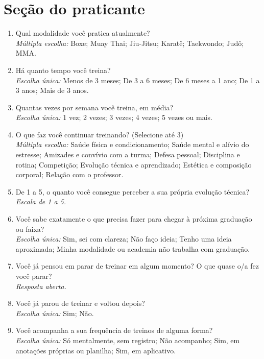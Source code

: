 \section*{Seção do praticante}
\begin{enumerate}[leftmargin=*, itemsep=1pt, parsep=0pt]
  \item Qual modalidade você pratica atualmente?\\
        {\footnotesize\textit{Múltipla escolha:} Boxe; Muay Thai; Jiu-Jitsu; Karatê; Taekwondo; Judô; MMA.}
  \item Há quanto tempo você treina?\\
        {\footnotesize\textit{Escolha única:} Menos de 3 meses; De 3 a 6 meses; De 6 meses a 1 ano; De 1 a 3 anos; Mais de 3 anos.}
  \item Quantas vezes por semana você treina, em média?\\
        {\footnotesize\textit{Escolha única:} 1 vez; 2 vezes; 3 vezes; 4 vezes; 5 vezes ou mais.}
  \item O que faz você continuar treinando? (Selecione até 3)\\
        {\footnotesize\textit{Múltipla escolha:} Saúde física e condicionamento; Saúde mental e alívio do estresse; Amizades e convívio com a turma; Defesa pessoal; Disciplina e rotina; Competição; Evolução técnica e aprendizado; Estética e composição corporal; Relação com o professor.}
  \item De 1 a 5, o quanto você consegue perceber a sua própria evolução técnica?\\
        {\footnotesize\textit{Escala de 1 a 5.}}
  \item Você sabe exatamente o que precisa fazer para chegar à próxima graduação ou faixa?\\
        {\footnotesize\textit{Escolha única:} Sim, sei com clareza; Não faço ideia; Tenho uma ideia aproximada; Minha modalidade ou academia não trabalha com graduação.}
  \item Você já pensou em parar de treinar em algum momento? O que quase o/a fez você parar?\\
        {\footnotesize\textit{Resposta aberta.}}
  \item Você já parou de treinar e voltou depois?\\
        {\footnotesize\textit{Escolha única:} Sim; Não.}
  \item Você acompanha a sua frequência de treinos de alguma forma?\\
        {\footnotesize\textit{Escolha única:} Só mentalmente, sem registro; Não acompanho; Sim, em anotações próprias ou planilha; Sim, em aplicativo.}

\end{enumerate}
